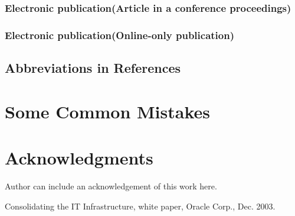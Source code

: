 \documentclass[11pt, onecolumn, twoside, a4paper]{article}
\begin{document}
\subsubsection{Electronic publication(Article in a conference proceedings)}
\subsubsection{Electronic publication(Online-only publication)}
\subsection{Abbreviations in References}






\section{Some Common Mistakes}



\section*{Acknowledgments}

Author can include an acknowledgement of this work here. 


\begin{thebibliography}{9}

 Consolidating the IT Infrastructure, white paper, Oracle Corp., Dec. 2003.
\end{thebibliography}
\end{document}
